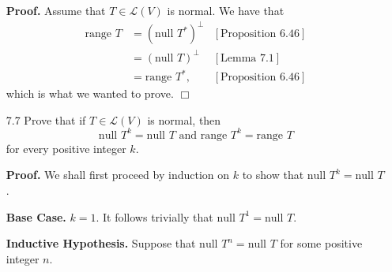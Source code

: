 \documentclass[9pt]{article}
\newcommand{\qed}{\hfill \ensuremath{\Box}}
\begin{document}
\begin{enumerate}
      \textbf{Proof.} Assume that $T \in \mathcal{L}(V)$ is normal. We have that
      \begin{align*}
         \text{range } T &= (\text{null } T^*)^\perp
            &[\text{Proposition }6.46] \\
            &= (\text{null } T)^\perp  &[\text{Lemma }7.1] \\
            &= \text{range } T^*, &[\text{Proposition }6.46]
      \end{align*}
      which is what we wanted to prove. \qed
   \item[7.7]  Prove that if $T \in \mathcal{L}(V)$ is normal, then
               $$
                  \text{null } T^k = \text{null } T \text{ and }
                  \text{range }T^k = \text{range }T$$
               for every positive integer $k$.

      \textbf{Proof.} We shall first proceed by induction on $k$ to show that
      $\text{null } T^k = \text{null } T$.

      \textbf{Base Case.} $k = 1$. It follows trivially that
      $\text{null } T^1 = \text{null } T$.

      \textbf{Inductive Hypothesis.} Suppose that
      $\text{null } T^n = \text{null }T$ for some positive integer $n$. \\


\end{enumerate}
\end{document}

